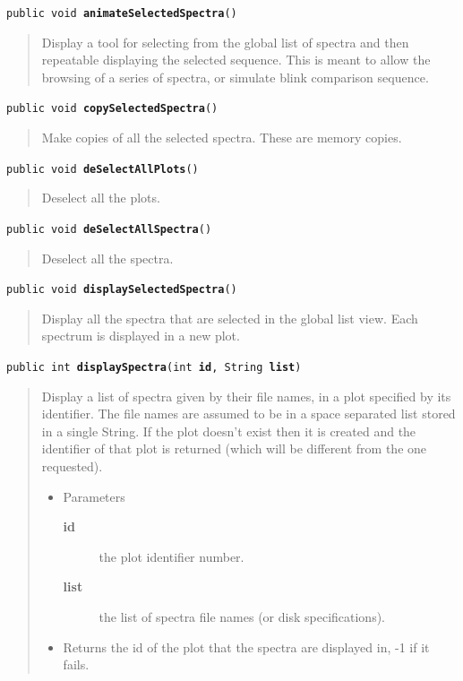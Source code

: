 \documentclass[twoside,11pt]{article}
\renewcommand{\_}{\texttt{\symbol{95}}}
\newcommand{\method}[1]{\texttt{#1}}
\newenvironment{desc}{\begin{quote}}{\end{quote}}
\begin{document}
\method{public void \textbf{animateSelectedSpectra}()\label{l342}\label{l343}}
\begin{desc}Display a tool for selecting from the global list of spectra
 and then repeatable displaying the selected sequence. This is
 meant to allow the browsing of a series of spectra, or simulate
 blink comparison sequence.
\end{desc}

\method{public void \textbf{copySelectedSpectra}()\label{l344}\label{l345}}
\begin{desc}Make copies of all the selected spectra. These are memory
 copies.
\end{desc}

\method{public void \textbf{deSelectAllPlots}()\label{l346}\label{l347}}
\begin{desc}Deselect all the plots.
\end{desc}

\method{public void \textbf{deSelectAllSpectra}()\label{l348}\label{l349}}
\begin{desc}Deselect all the spectra.
\end{desc}

\method{public void \textbf{displaySelectedSpectra}()\label{l350}\label{l351}}
\begin{desc}Display all the spectra that are selected in the global list
 view. Each spectrum is displayed in a new plot.
\end{desc}

\method{public int \textbf{displaySpectra}(\texttt{int} \textbf{id}, \texttt{String} \textbf{list})\label{l352}\label{l353}}
\begin{desc}Display a list of spectra given by their file names, in a plot
 specified by its identifier. The file names are assumed to be
 in a space separated list stored in a single String. If the
 plot doesn't exist then it is created and the identifier of
 that plot is returned (which will be different from the one
 requested).
\begin{itemize}
\item{Parameters
  \begin{description}
   \item[\textbf{id}]{the plot identifier number.}
   \item[\textbf{list}]{the list of spectra file names (or disk
             specifications).}
  \end{description}}
\end{itemize}
\begin{itemize}
\item{Returns the id of the plot that the spectra are displayed
         in, -1 if it fails. }
\end{itemize}
\end{desc}
\end{document}
